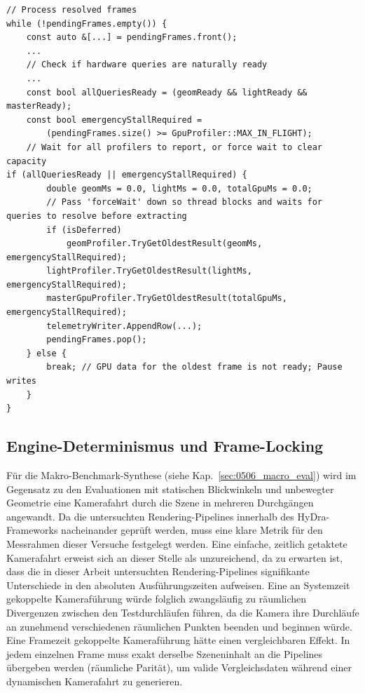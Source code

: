 \begin{listing}[htbp]
    \begin{codeframe}
        \begin{verbatim}
// Process resolved frames
while (!pendingFrames.empty()) {
    const auto &[...] = pendingFrames.front();
    ...
    // Check if hardware queries are naturally ready
    ...
    const bool allQueriesReady = (geomReady && lightReady && masterReady);
    const bool emergencyStallRequired =
        (pendingFrames.size() >= GpuProfiler::MAX_IN_FLIGHT);
    // Wait for all profilers to report, or force wait to clear capacity
if (allQueriesReady || emergencyStallRequired) {
        double geomMs = 0.0, lightMs = 0.0, totalGpuMs = 0.0;
        // Pass 'forceWait' down so thread blocks and waits for queries to resolve before extracting
        if (isDeferred)
            geomProfiler.TryGetOldestResult(geomMs, emergencyStallRequired);
        lightProfiler.TryGetOldestResult(lightMs, emergencyStallRequired);
        masterGpuProfiler.TryGetOldestResult(totalGpuMs, emergencyStallRequired);
        telemetryWriter.AppendRow(...);
        pendingFrames.pop();
    } else {
        break; // GPU data for the oldest frame is not ready; Pause writes
    }
}
        \end{verbatim}
    \end{codeframe}
    \caption[C++-Code zum Notfall-Stall-Verfahren im HyDra-Framework]
    {C++ Code zu Ring-Buffer und Notfall-Stall Verfahren während der Benchmark-Orchestrierung im
    HyDra-Framework}
    \label{lst:orchestrator_stall}
\end{listing}

\subsection{Engine-Determinismus und Frame-Locking}
\label{subsec:040403_determinism_and_frame_locking}

Für die Makro-Benchmark-Synthese (siehe Kap.~\ref{sec:0506_macro_eval}) wird im Gegensatz zu den Evaluationen mit
statischen Blickwinkeln und unbewegter Geometrie eine Kamerafahrt durch die Szene in mehreren Durchgängen angewandt.
Da die untersuchten Rendering-Pipelines innerhalb des \ac{HyDra}-Frameworks nacheinander geprüft werden, muss eine klare
Metrik für den Messrahmen dieser Versuche festgelegt werden.
Eine einfache, zeitlich getaktete Kamerafahrt erweist sich an dieser Stelle als unzureichend, da zu erwarten ist, dass
die in dieser Arbeit untersuchten Rendering-Pipelines signifikante Unterschiede in den absoluten Ausführungszeiten
aufweisen.
Eine an Systemzeit gekoppelte Kameraführung würde folglich zwangsläufig zu räumlichen Divergenzen zwischen den
Testdurchläufen führen, da die Kamera ihre Durchläufe an zunehmend verschiedenen räumlichen Punkten beenden und
beginnen würde.
Eine Framezeit gekoppelte Kameraführung hätte einen vergleichbaren Effekt.
In jedem einzelnen Frame muss exakt derselbe Szeneninhalt an die Pipelines übergeben werden (räumliche Parität), um
valide Vergleichsdaten während einer dynamischen Kamerafahrt zu generieren.

